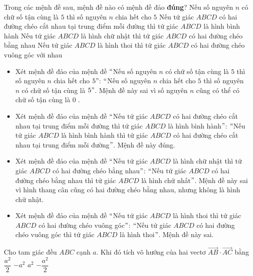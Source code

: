 \begin{ex}%
Trong các mệnh đề sau, mệnh đề nào có mệnh đề đảo \textbf{đúng}?
\choice
{Nếu số nguyên $n$ có chữ số tận cùng là $5$ thì số nguyên $n$ chia hết cho $5$}
{\True Nếu tứ giác $ABCD$ có hai đường chéo cắt nhau tại trung điểm mỗi đường thì tứ giác $ABCD$ là hình bình hành}
{Nếu tứ giác $ABCD$ là hình chữ nhật thì tứ giác $ABCD$ có hai đường chéo bằng nhau}
{Nếu tứ giác $ABCD$ là hình thoi thì tứ giác $ABCD$ có hai đường chéo vuông góc với nhau}
\loigiai
{
\begin{itemize}
\item Xét mệnh đề đảo của mệnh đề $``$Nếu số nguyên $n$ có chữ số tận cùng là $5$ thì số nguyên $n$ chia hết cho $5"$: $``$Nếu số nguyên $n$ chia hết cho $5$ thì số nguyên $n$ có chữ số tận cùng là $5"$. Mệnh đề này sai vì số nguyên $n$ cũng có thể có chữ số tận cùng là $0$ .
\item Xét mệnh đề đảo của mệnh đề $``$Nếu tứ giác $ABCD$ có hai đường chéo cắt nhau tại trung điểm mỗi đường thì tứ giác $ABCD$ là hình bình hành$"$: $``$Nếu tứ giác $ABCD$ là hình bình hành thì tứ giác $ABCD$ có hai đường chéo cắt nhau tại trung điểm mỗi đường$"$. Mệnh đề này đúng.
\item Xét mệnh đề đảo của mệnh đề $``$Nếu tứ giác $ABCD$ là hình chữ nhật thì tứ giác $ABCD$ có hai đường chéo bằng nhau$"$: $``$Nếu tứ giác $ABCD$ có hai đường chéo bằng nhau thì tứ giác $ABCD$ là hình chữ nhất$"$. Mệnh đề này sai vì hình thang cân cũng có hai đường chéo bằng nhau, nhưng không là hình chữ nhật.
\item Xét mệnh đề đảo của mệnh đề $``$Nếu tứ giác $ABCD$ là hình thoi thì tứ giác $ABCD$ có hai đường chéo vuông góc$"$: $``$Nếu tứ giác $ABCD$ có hai đường chéo vuông góc thì tứ giác $ABCD$ là hình thoi$"$. Mệnh đề này sai.

\end{itemize}
}
\end{ex}

\begin{ex}%
Cho tam giác đều $ABC$ cạnh $a$. Khi đó tích vô hướng của hai vectơ $\overrightarrow{AB}\cdot\overrightarrow{AC}$ bằng
\choice
{\True $\dfrac{a^2}{2}$}
{$-a^2$}
{$a^2$}
{$-\dfrac{a^2}{2}$}
\end{ex}

